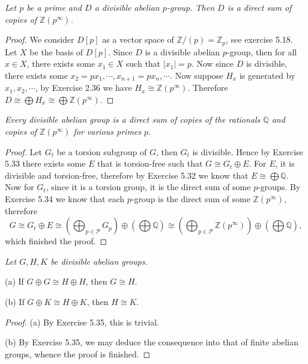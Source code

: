 \begin{problem}\em
Let $p$ be a prime and $D$ a divisible abelian $p$-group. Then $D$ is a direct sum of copies of $\mathbb{Z}(p^\infty)$.
\end{problem}
\begin{proof}
We consider $D[p]$ as a vector space of $\mathbb{Z}/(p)=\mathbb{Z}_p$, see exercise 5.18. Let $X$ be the basis of $D[p]$. Since $D$ is a divisible abelian $p$-group, then for all $x\in X$, there exists some $x_1\in X$ such that $|x_1|=p$. Now since $D$ is divisible, there exists some $x_2=px_1,\cdots,x_{n+1}=px_n,\cdots$. Now suppose $H_x$ is generated by $x_1,x_2,\cdots$, by Exercise 2.36 we have $H_x\cong\mathbb{Z}(p^\infty)$. Therefore $D\cong\bigoplus H_x\cong\bigoplus\mathbb{Z}(p^\infty)$.
\end{proof}
\begin{problem}\em
Every divisible abelian group is a direct sum of copies of the rationals $\mathbb{Q}$ and copies of $\mathbb{Z}(p^\infty)$ for various primes $p$.
\end{problem}
\begin{proof}
Let $G_t$ be a torsion subgroup of $G$, then $G_t$ is divisible. Hence by Exercise 5.33 there exists some $E$ that is torsion-free such that $G\cong G_t\oplus E$. For $E$, it is divisible and torsion-free, therefore by Exercise 5.32 we know that $E\cong\bigoplus\mathbb{Q}$. Now for $G_t$, since it is a torsion group, it is the direct sum of some $p$-groups. By Exercise 5.34 we know that each $p$-group is the direct sum of some $\mathbb{Z}(p^\infty)$, therefore 
$$
G\cong G_t\oplus E\cong \left( \bigoplus_{p\in \mathcal{P}}{G_p} \right) \oplus \left( \bigoplus{\mathbb{Q}} \right) \cong \left( \bigoplus_{p\in \mathcal{P}}{\mathbb{Z} \left( p^{\infty} \right)} \right) \oplus \left( \bigoplus{\mathbb{Q}} \right) ,
$$
which finished the proof.
\end{proof}
\begin{problem}\em
Let $G,H,K$ be divisible abelian groups.\par
(a) If $G\oplus G\cong H\oplus H$, then $G\cong H$.\par
(b) If $G\oplus K\cong H\oplus K$, then $H\cong K$.
\end{problem}
\begin{proof}
(a) By Exercise 5.35, this is trivial.\par
(b) By Exercise 5.35, we may deduce the consequence into that of finite abelian groups, whence the proof is finished.
\end{proof}
